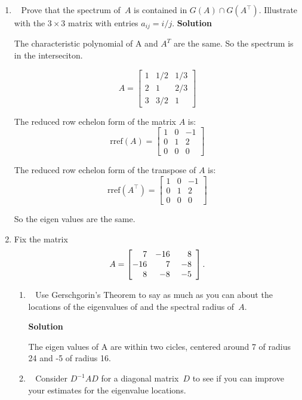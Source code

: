 \documentclass[11pt]{article}
\newcommand\score[1]{\marginpar{\vspace{-2ex}\color{blue}{#1/3}}\hspace{-1ex}}
\newcommand\0{\mathbf{0}}
\newcommand\<{\langle}
\renewcommand\>{\rangle}
\begin{document}
\begin{enumerate}
\item\ \score{3}%
Prove that the spectrum of~$A$ is contained in $G(A) \cap G(A^\top)$.
Illustrate with the $3 \times 3$ matrix with entries $a_{ij} = i/j$.
\textbf{Solution}

The characteristic polynomial of A and $A^{T}$ are the same. So the spectrum
is in the interseciton.

$$
A=\begin{bmatrix}
  1 & 1/2 & 1/3\\
  2 & 1 & 2/3\\
  3 & 3/2 & 1
\end{bmatrix}
$$

The reduced row echelon form of the matrix \( A \) is:
\[
\text{rref}(A) =
\begin{bmatrix}
1 & 0 & -1 \\
0 & 1 & 2 \\
0 & 0 & 0
\end{bmatrix}
\]

The reduced row echelon form of the transpose of \( A \) is:
\[
\text{rref}(A^\top) =
\begin{bmatrix}
1 & 0 & -1 \\
0 & 1 & 2 \\
0 & 0 & 0
\end{bmatrix}
\]

So the eigen values are the same.

\item%
Fix the matrix
  $$%
  A =
  \left[
  \begin{array}{@{}rrr}
     7 & -16\ &  8 \\
   -16 &  7 \ & -8 \\
     8 & -8 \ & -5 
  \end{array}
  \right].
  $$%
\begin{enumerate}%
  \item\ \score{3}%
  Use Gerschgorin's Theorem to say as much as you can about the
  locations of the eigenvalues of and the spectral radius of~$A$.

  \textbf{Solution}

  The eigen values of A are within two cicles, centered around 7 of radius 24 and -5 of radius 16.
  
  \item\ \score{3}%
  Consider $D^{-1}AD$ for a diagonal matrix~$D$ to see if you can
  improve your estimates for the eigenvalue locations.


\end{enumerate}
\end{enumerate}
\end{document}
